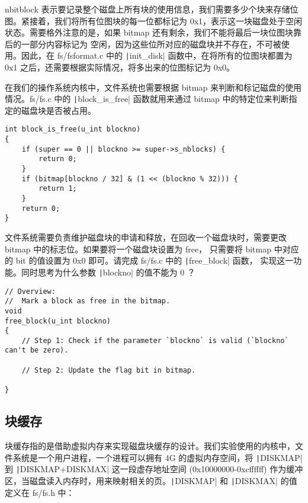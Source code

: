 nbitblock 表示要记录整个磁盘上所有块的使用信息，我们需要多少个块来存储位图。紧接着，我们将所有位图块的每一位都标记为
0x1，表示这一块磁盘处于空闲状态。需要格外注意的是，如果 bitmap 还有剩余，我们不能将最后一块位图块靠后的一部分内容标记为
空闲，因为这些位所对应的磁盘块并不存在，不可被使用。因此，在 fs/fsformat.c 中的 \texttt|init_disk|
函数中，在将所有的位图块都置为 0x1 之后，还需要根据实际情况，将多出来的位图标记为 0x0。

在我们的操作系统内核中，文件系统也需要根据 bitmap 来判断和标记磁盘的使用情况。fs/fs.c 中的 \texttt|block_is_free|
函数就用来通过 bitmap 中的特定位来判断指定的磁盘块是否被占用。

\begin{verbatim}
int block_is_free(u_int blockno)
{
    if (super == 0 || blockno >= super->s_nblocks) {
        return 0;
    }
    if (bitmap[blockno / 32] & (1 << (blockno % 32))) {
        return 1;
    }
    return 0;
}
\end{verbatim}

\begin{exercise}
文件系统需要负责维护磁盘块的申请和释放，在回收一个磁盘块时，需要更改 bitmap 中的标志位。如果要将一个磁盘块设置为 free，
只需要将 bitmap 中对应的 bit 的值设置为 0x0 即可。请完成 fs/fs.c 中的 \texttt|free_block| 函数，
实现这一功能。同时思考为什么参数 \texttt|blockno| 的值不能为 0 ？

\begin{verbatim}
// Overview:
//  Mark a block as free in the bitmap.
void
free_block(u_int blockno)
{
    // Step 1: Check if the parameter `blockno` is valid (`blockno` can't be zero). 

    // Step 2: Update the flag bit in bitmap.

}
\end{verbatim}

\end{exercise}

\subsection{块缓存}

块缓存指的是借助虚拟内存来实现磁盘块缓存的设计。我们实验使用的内核中，文件系统是一个用户进程，一个进程可以拥有 4G 
的虚拟内存空间，将 \texttt|DISKMAP| 到 \texttt|DISKMAP+DISKMAX| 这一段虚存地址空间
(0x10000000-0xcffffff) 作为缓冲区，当磁盘读入内存时，用来映射相关的页。\texttt|DISKMAP| 和
\texttt|DISKMAX| 的值定义在 fs/fs.h 中：

